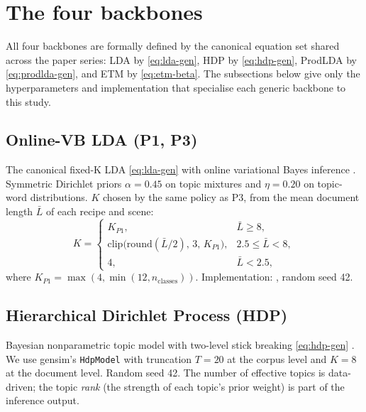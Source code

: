 \documentclass[journal,a4paper,10pt]{IEEEtran}
\begin{document}
\section{The four backbones}\label{sec:backbones}

All four backbones are formally defined by the canonical equation set
shared across the paper series: LDA by \eqref{eq:lda-gen}, HDP by
\eqref{eq:hdp-gen}, ProdLDA by \eqref{eq:prodlda-gen}, and ETM by
\eqref{eq:etm-beta}. The
subsections below give only the hyperparameters and implementation that
specialise each generic backbone to this study.

\subsection{Online-VB LDA (P1, P3)}
The canonical fixed-K LDA \eqref{eq:lda-gen} with online variational
Bayes inference
\cite{hoffman2010online}. Symmetric Dirichlet priors $\alpha = 0.45$
on topic mixtures and $\eta = 0.20$ on topic-word distributions.
$K$ chosen by the same policy as P3, from the mean document length
$\bar{L}$ of each recipe and scene:
\[
K = \begin{cases}
K_{P1}, & \bar{L} \ge 8,\\
\mathrm{clip}\big(\mathrm{round}(\bar{L}/2),\, 3,\, K_{P1}\big), & 2.5 \le \bar{L} < 8,\\
4, & \bar{L} < 2.5,
\end{cases}
\]
where $K_{P1} = \max(4, \min(12, n_{\mathrm{classes}}))$. Implementation:
, random seed 42.

\subsection{Hierarchical Dirichlet Process (HDP)}
Bayesian nonparametric topic model with two-level stick breaking
\eqref{eq:hdp-gen} \cite{teh2006hdp}. We use gensim's \texttt{HdpModel} with truncation
$T=20$ at the corpus level and $K=8$ at the document level. Random
seed 42. The number of effective topics is data-driven; the topic
\emph{rank} (the strength of each topic's prior weight) is part of
the inference output.
\end{document}
